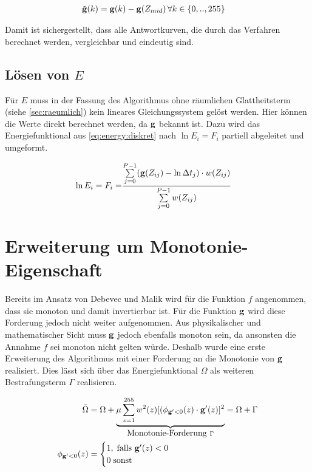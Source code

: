 \begin{align}
\tilde{\mathbf g}(k) &= \mathbf g(k)-\mathbf g(Z_{mid})\, \forall k \in \{0,..,255\}
\end{align}

Damit ist sichergestellt, dass alle Antwortkurven, die durch das Verfahren berechnet werden, vergleichbar und eindeutig sind.



\subsection{Lösen von $E$}
Für $E$ muss in der Fassung des Algorithmus ohne räumlichen Glattheitsterm (siehe \autoref{sec:raeumlich}) kein lineares Gleichungssystem  gelöst werden. Hier können die Werte direkt berechnet werden, da $\mathbf g$ bekannt ist. Dazu wird das Energiefunktional aus \autoref{eq:energy:diskret} nach $\ln E_i = F_i$ partiell abgeleitet und umgeformt.    

\begin{align}
\label{eq:fi:basic}
    \ln E_i = F_i =& \frac{\sum \limits_{j=0}^{P-1} (\mathbf g(Z_{ij})-\ln \Delta t_j)\cdot w(Z_{ij})}{\sum \limits_{j=0}^{P-1} w(Z_{ij})}
\end{align}



\section{Erweiterung um Monotonie-Eigenschaft}
\label{sec:monotonie}

Bereits im Ansatz von Debevec und Malik wird für die Funktion $f$ angenommen, dass sie monoton und damit invertierbar ist. Für die Funktion $\mathbf g$ wird diese Forderung jedoch nicht weiter aufgenommen. Aus physikalischer und mathematischer Sicht muss $\mathbf g$ jedoch ebenfalls monoton sein, da ansonsten die Annahme $f$ sei monoton nicht gelten würde. Deshalb wurde eine erste Erweiterung des Algorithmus mit einer Forderung an die Monotonie von $\mathbf g$ realisiert. Dies lässt sich über das Energiefunktional $\Omega$ als weiteren Bestrafungsterm $\Gamma$ realisieren.

\begin{align}
\tilde{\Omega} &= \Omega + \underbrace{\mu \sum \limits_{z=1}^{255} w^2(z) [(\phi_{\mathbf g'<0}(z)\cdot \mathbf g'(z)]^2}_{\mbox{Monotonie-Forderung } \Gamma} = \Omega + \Gamma\\
\phi_{\mathbf g'<0}(z) &= 
    \begin{cases} 
        1, \; \mbox{falls } \mathbf g'(z) < 0\\ 
        0 \; \mbox{sonst}
    \end{cases}
\end{align}

